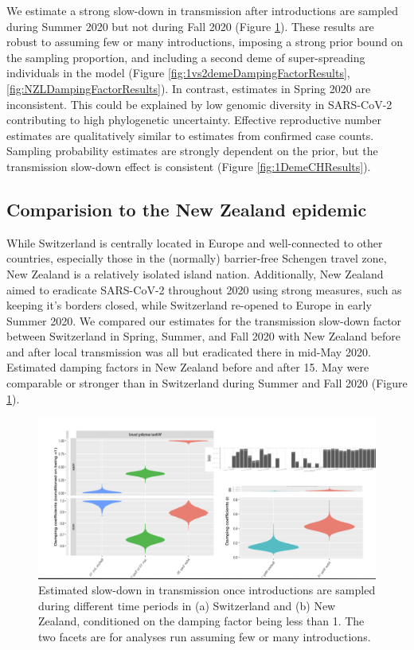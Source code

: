 \documentclass[9pt,twoside,lineno]{pnas-new} %
\begin{document}
We estimate a strong slow-down in transmission after introductions are sampled during Summer 2020 but not during Fall 2020 (Figure \ref{fig:scale-factor}). These results are robust to assuming few or many introductions, imposing a strong prior bound on the sampling proportion, and including a second deme of super-spreading individuals in the model (Figure \ref{fig:1vs2demeDampingFactorResults}, \ref{fig:NZLDampingFactorResults}). In contrast, estimates in Spring 2020 are inconsistent. This could be explained by low genomic diversity in SARS-CoV-2 contributing to high phylogenetic uncertainty. Effective reproductive number estimates are qualitatively similar to estimates from confirmed case counts. Sampling probability estimates are strongly dependent on the prior, but the transmission slow-down effect is consistent (Figure \ref{fig:1DemeCHResults}).

\subsection{Comparision to the New Zealand epidemic}
While Switzerland is centrally located in Europe and well-connected to other countries, especially those in the (normally) barrier-free Schengen travel zone, New Zealand is a relatively isolated island nation. Additionally, New Zealand aimed to eradicate SARS-CoV-2 throughout 2020 using strong measures, such as keeping it's borders closed, while Switzerland re-opened to Europe in early Summer 2020. We compared our estimates for the transmission slow-down factor between Switzerland in Spring, Summer, and Fall 2020 with New Zealand before and after local transmission was all but eradicated there in mid-May 2020. Estimated damping factors in New Zealand before and after 15. May were comparable or stronger than in Switzerland during Summer and Fall 2020 (Figure \ref{fig:scale-factor}).

\begin{figure}[H]
\centering
\includegraphics[width=\linewidth]{figures/bdsky_2021-08-18/scale_factor_comparison.png}
\caption{Estimated slow-down in transmission once introductions are sampled during different time periods in (a) Switzerland and (b) New Zealand, conditioned on the damping factor being less than 1. The two facets are for analyses run assuming few or many introductions.}  
\label{fig:scale-factor}
\end{figure}
\end{document}
